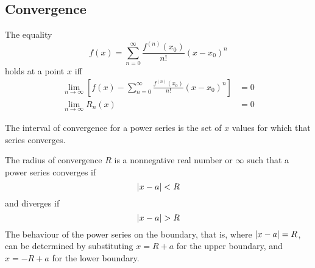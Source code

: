 \documentclass{article}
\begin{document}
\subsection{Convergence}
\begin{theorem}
    The equality
    \begin{equation*}
        f(x) = \sum_{n=0}^{\infty} \frac{f^{\left( n \right)}(x_0)}{n!} \left( x-x_0 \right)^n
    \end{equation*}
    holds at a point $x$ iff
    \begin{align*}
        \lim_{n\to\infty} \left[ f(x) - \sum_{n=0}^{\infty} \frac{f^{\left( n \right)}(x_0)}{n!} \left( x-x_0 \right)^n \right] &= 0 \\
        \lim_{n\to\infty} R_n(x) &= 0
    \end{align*}
\end{theorem}
\begin{definition}
    The interval of convergence for a power series is the set of $x$ values for
    which that series converges.
\end{definition}
\begin{definition}
    The radius of convergence $R$ is a nonnegative real number or $\infty$ such
    that
    a power series converges if
    \begin{equation*}
        \abs{x - a} < R
    \end{equation*}
    and diverges if
    \begin{equation*}
        \abs{x - a} > R
    \end{equation*}
    The behaviour of the power series on the boundary, that is, where
    $\abs{x - a} = R$, can be determined by substituting $x = R + a$ for the
    upper boundary, and $x = -R + a$ for the lower boundary.
\end{definition}
\end{document}
